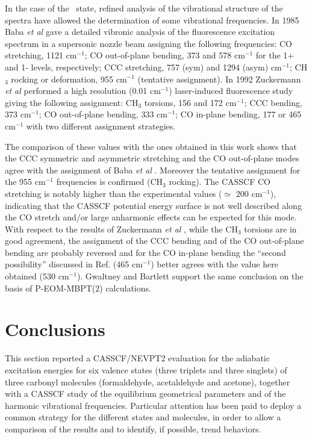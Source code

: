 In the case of the \snpi\ state, refined analysis of the vibrational
structure of the spectra have allowed the determination of some vibrational
frequencies.  In 1985 Baba {\it et al} \cite{cp-93-425-1985} gave a
detailed vibronic analysis of the fluorescence excitation spectrum in a
supersonic nozzle beam assigning the following frequencies: CO stretching,
1121 cm$^{-1}$; CO out-of-plane bending, 373 and 578 cm$^{-1}$ for the 1+
and 1- levels, respectively; CCC stretching, 757 (sym) and 1294 (asym)
cm$^{-1}$; CH$_3$ rocking or deformation, 955 cm$^{-1}$ (tentative
assignment).  In 1992 Zuckermann {\it et al} \cite{cp-163-193-1992}
performed a high resolution (0.01 cm$^{-1}$) laser-induced fluorescence
study giving the following assignment: CH$_3$ torsions, 156 and 172
cm$^{-1}$; CCC bending, 373 cm$^{-1}$; CO out-of-plane bending, 333
cm$^{-1}$; CO in-plane bending, 177 or 465 cm$^{-1}$ with two different
assignment strategies.

The comparison of these values with the ones obtained in this work shows
that the CCC symmetric and asymmetric stretching and the CO out-of-plane
modes agree with the assignment of Baba {\it et al} \cite{cp-93-425-1985}.
Moreover the tentative assignment for the 955 cm$^{-1}$ frequencies is
confirmed (CH$_3$ rocking). The CASSCF CO stretching is notably higher than
the experimental values ($\simeq$ 200 cm$^{-1}$), indicating that the CASSCF
potential energy surface is not well described along the CO stretch and/or
large anharmonic effects can be expected for this mode. With respect to the
results of Zuckermann {\it et al} \cite{cp-163-193-1992}, while the CH$_3$
torsions are in good agreement, the assignment of the CCC bending and of the
CO out-of-plane bending are probably reversed and for the CO in-plane
bending the ``second possibility'' discussed in Ref. 
(465 cm$^{-1}$) better agrees with the value here obtained (530 cm$^{-1}$).
Gwaltney and Bartlett \cite{jcp-110-62-1999} support the same conclusion on
the basis of P-EOM-MBPT(2) calculations.

\section*{Conclusions}
This section reported a CASSCF/NEVPT2 evaluation for the adiabatic
excitation energies for six valence states (three triplets and three
singlets) of three carbonyl molecules (formaldehyde, acetaldehyde and
acetone), together with a CASSCF study of the equilibrium geometrical
parameters and of the harmonic vibrational frequencies. Particular attention
has been paid to deploy a common strategy for the different states and
molecules, in order to allow a comparison of the results and to identify, if
possible, trend behaviors. 


